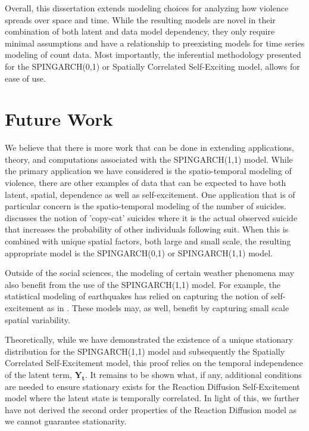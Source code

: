 \documentclass[11pt]{isuthesis}
\begin{document}
	Overall, this dissertation extends modeling choices for analyzing how violence spreads over space and time.  While the resulting models are novel in their combination of both latent and data model dependency, they only require minimal assumptions and have a relationship to preexisting models for time series modeling of count data.  Most importantly, the inferential methodology presented for the SPINGARCH(0,1) or Spatially Correlated Self-Exciting model, allows for ease of use.
	
	\section{Future Work}
	
	We believe that there is more work that can be done in extending applications, theory, and computations associated with the SPINGARCH(1,1) model.  While the primary application we have considered is the spatio-temporal modeling of violence, there are other examples of data that can be expected to have both latent, spatial, dependence as well as self-excitement.  One application that is of particular concern is the spatio-temporal modeling of the number of suicides.  \cite{phillips1974influence} discusses the notion of 'copy-cat' suicides where it is the actual observed suicide that increases the probability of other individuals following suit.  When this is combined with unique spatial factors, both large and small scale, the resulting appropriate model is the SPINGARCH(0,1) or SPINGARCH(1,1) model.  
	
	Outside of the social sciences, the modeling of certain weather phenomena may also benefit from the use of the SPINGARCH(1,1) model.  For example, the statistical modeling of earthquakes has relied on capturing the notion of self-excitement as in \cite{ogata1988statistical}.  These models may, as well, benefit by capturing small scale spatial variability.
	
	Theoretically, while we have demonstrated the existence of a unique stationary distribution for the SPINGARCH(1,1) model and subsequently the Spatially Correlated Self-Excitement model, this proof relies on the temporal independence of the latent term, $\boldsymbol{Y_t}$.  It remains to be shown what, if any, additional conditions are needed to ensure stationary exists for the Reaction Diffusion Self-Excitement model where the latent state is temporally correlated.  In light of this, we further have not derived the second order properties of the Reaction Diffusion model as we cannot guarantee stationarity.
	
\end{document}
